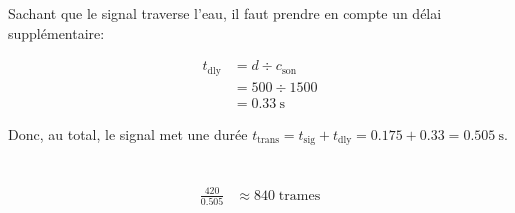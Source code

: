 \documentclass{article}
\begin{document}
Sachant que le signal traverse l'eau, il faut prendre en compte un délai supplémentaire: 

\begin{equation*}
    \begin{split}
        t_\text{dly} &= d \div c_\text{son} \\
        &= 500 \div 1500 \\
        &= \SI{0.33}{\second}
    \end{split}
\end{equation*}

Donc, au total, le signal met une durée $t_\text{trans} = t_\text{sig} + t_\text{dly} = 0.175 + 0.33 = \SI{0.505}{\second}$.

\section{}

\begin{equation*}
    \begin{split}
        \frac{420}{0.505} &\approx 840\;\text{trames}
    \end{split}
\end{equation*}
\end{document}
